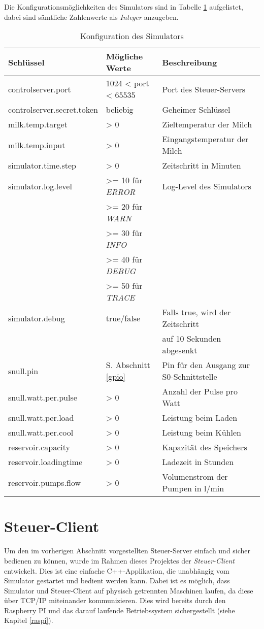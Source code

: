 Die Konfigurationsmöglichkeiten des Simulators sind in Tabelle \ref{tab:simulatorconfig} aufgelistet, dabei sind sämtliche Zahlenwerte als \emph{Integer} anzugeben.

\begin{table}[H]
\centering
\begin{tabularx}{\textwidth}{|p{}|p{}|X|}
\hline
\textbf{Schlüssel} & \textbf{Mögliche Werte} & \textbf{Beschreibung} \\ \hline
controlserver.port & 1024 < port < 65535 & Port des Steuer-Servers \\ \hline
controlserver.secret.token & beliebig & Geheimer Schlüssel \\ \hline
milk.temp.target & > 0 & Zieltemperatur der Milch \\ \hline
milk.temp.input & > 0 & Eingangstemperatur der Milch \\ \hline
simulator.time.step & > 0 & Zeitschritt in Minuten \\ \hline
simulator.log.level & >= 10 für \emph{ERROR} & Log-Level des Simulators \\
 & >= 20 für \emph{WARN} & \\ 
 & >= 30 für \emph{INFO} & \\
 & >= 40 für \emph{DEBUG} & \\ 
 & >= 50 für \emph{TRACE} & \\ \hline
simulator.debug & true/false & Falls true, wird der Zeitschritt \\
 & & auf 10 Sekunden abgesenkt \\ \hline
snull.pin & S. Abschnitt \ref{gpio} & Pin für den Ausgang zur S0-Schnittstelle \\ \hline
snull.watt.per.pulse & > 0 & Anzahl der Pulse pro Watt \\ \hline
snull.watt.per.load & > 0 & Leistung beim Laden \\ \hline
snull.watt.per.cool & > 0 & Leistung beim Kühlen \\ \hline
reservoir.capacity & > 0 & Kapazität des Speichers \\ \hline
reservoir.loadingtime & > 0 & Ladezeit in Stunden \\ \hline
reservoir.pumps.flow & > 0 & Volumenstrom der Pumpen in l/min \\ \hline
\end{tabularx}
\caption{Konfiguration des Simulators}
\label{tab:simulatorconfig}
\end{table}

\section{Steuer-Client}\label{steuerclient}
Um den im vorherigen Abschnitt vorgestellten Steuer-Server einfach und sicher bedienen zu können, wurde im Rahmen dieses Projektes der \emph{Steuer-Client} entwickelt. Dies ist eine einfache C++-Applikation, die unabhängig vom Simulator gestartet und bedient werden kann. Dabei ist es möglich, dass Simulator und Steuer-Client auf physisch getrennten Maschinen laufen, da diese über TCP/IP miteinander kommunizieren. Dies wird bereits durch den Raspberry PI und das darauf laufende Betriebssystem sichergestellt (siehe Kapitel \ref{raspi}).


